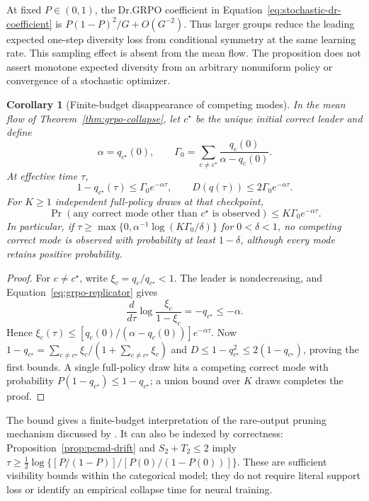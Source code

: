 \documentclass{article}
\newcommand{\enforcehalffinalproseline}{%
  \setlength{\parfillskip}{0pt plus .20\linewidth}}
\newcommand{\1}{\mathbf 1}
\newtheorem{corollary}[lemma]{Corollary}
\theoremstyle{remark}
\theoremstyle{definition}
\theoremstyle{plain}
\begin{document}
At fixed $P\in(0,1)$, the Dr.GRPO coefficient in
Equation~\eqref{eq:stochastic-dr-coefficient} is
$P(1-P)^2/G+O(G^{-2})$. Thus larger groups reduce the leading expected
one-step diversity loss from conditional symmetry at the same learning rate.
This sampling effect is absent from the mean flow. The proposition does not
assert monotone expected diversity from an arbitrary nonuniform policy or
convergence of a stochastic optimizer.

\begin{corollary}[Finite-budget disappearance of competing modes]
\enforcehalffinalproseline
\label{cor:finite-budget-invisibility}
In the mean flow of Theorem~\ref{thm:grpo-collapse}, let $c^\star$ be the
unique initial correct leader and define
\[
 \alpha=q_{c^\star}(0),
 \qquad
 \Gamma_0=\sum_{c\ne c^\star}
             \frac{q_c(0)}{\alpha-q_c(0)}.
\]
At effective time $\tau$,
\begin{equation}
 1-q_{c^\star}(\tau)\le\Gamma_0e^{-\alpha\tau},
 \qquad D(q(\tau))\le2\Gamma_0e^{-\alpha\tau}.
 \label{eq:finite-minority-bound}
\end{equation}
For $K\ge1$ independent full-policy draws at that checkpoint,
\begin{equation}
 \Pr(\text{any correct mode other than }c^\star\text{ is observed})
 \le K\Gamma_0e^{-\alpha\tau}.
 \label{eq:finite-inference-visibility}
\end{equation}
In particular, if
$\tau\ge\max\{0,\alpha^{-1}\log(K\Gamma_0/\delta)\}$ for
$0<\delta<1$, no competing correct mode is observed with probability at
least $1-\delta$, although every mode retains positive probability.
\end{corollary}

\begin{proof}
\enforcehalffinalproseline
For $c\ne c^\star$, write $\xi_c=q_c/q_{c^\star}<1$.
The leader is nondecreasing, and Equation~\eqref{eq:grpo-replicator} gives
\[
 \frac{d}{d\tau}\log\frac{\xi_c}{1-\xi_c}
 =-q_{c^\star}\le-\alpha.
\]
Hence
$\xi_c(\tau)\le[q_c(0)/(\alpha-q_c(0))]e^{-\alpha\tau}$.
Now $1-q_{c^\star}=\sum_{c\ne c^\star}\xi_c/(1+\sum_{c\ne c^\star}\xi_c)$
and $D\le1-q_{c^\star}^2\le2(1-q_{c^\star})$, proving the first bounds.
A single full-policy draw hits a competing correct mode with probability
$P(1-q_{c^\star})\le1-q_{c^\star}$; a union bound over $K$ draws completes
the proof.
\end{proof}

The bound gives a finite-budget interpretation of the rare-output pruning
mechanism discussed by \citet[Section~4.2.5]{lochab2026ucpo}.
It can also be indexed by correctness: Proposition~\ref{prop:pcmd-drift}
and $S_2+T_2\le2$ imply
$\tau\ge\tfrac12\log\{[P/(1-P)]/[P(0)/(1-P(0))]\}$.
These are sufficient visibility bounds within the categorical model;
they do not require literal support loss or identify an empirical collapse
time for neural training.
\end{document}
